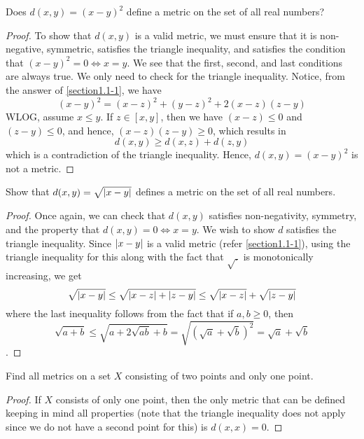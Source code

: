 \begin{question}
    Does $d(x,y) = (x-y)^2$ define a metric on the set of all real numbers?
\label{section1.1-2}
\end{question}{
\begin{proof}
    To show that $d(x,y)$ is a valid metric, we must ensure that it is non-negative, symmetric, satisfies the triangle inequality, and satisfies the condition that $(x-y)^2 = 0 \iff x = y$. We see that the first, second, and last conditions are always true. We only need to check for the triangle inequality. Notice, from the answer of \ref{section1.1-1}, we have
    \[(x-y)^2 = (x-z)^2 + (y-z)^2 + 2(x-z)(z-y)\]
    WLOG, assume $x \leq y$. If $z \in [x,y]$, then we have $(x-z) \leq 0$ and $(z-y) \leq 0$, and hence, $(x-z)(z-y) \geq 0$, which results in 
    \[d(x,y) \geq d(x,z) + d(z,y)\]
    which is a contradiction of the triangle inequality. Hence, $d(x,y) = (x-y)^2$ is not a metric.
\end{proof}

\begin{question}
    Show that $d(x,y) = \sqrt{\left\lvert x-y \right\rvert}$ defines a metric on the set of all real numbers.
\label{section1.1-3}
\end{question}
\begin{proof}
    Once again, we can check that $d(x,y)$ satisfies non-negativity, symmetry, and the property that $d(x,y) = 0 \iff x = y$. We wish to show $d$ satisfies the triangle inequality. Since $\left\lvert x-y \right\rvert$ is a valid metric (refer \ref{section1.1-1}), using the triangle inequality for this along with the fact that $\sqrt{.}$ is monotonically increasing, we get
    \[\sqrt{\left\lvert x-y \right\rvert} \leq \sqrt{\left\lvert x-z \right\rvert + \left\lvert z-y \right\rvert} \leq \sqrt{\left\lvert x-z \right\rvert} + \sqrt{\left\lvert z-y \right\rvert}\]
    where the last inequality follows from the fact that if $a , b \geq 0$, then 
    \[\sqrt{a + b} \leq \sqrt{a + 2\sqrt{ab} + b} = \sqrt{(\sqrt{a} + \sqrt{b})^2} = \sqrt{a} + \sqrt{b}\].
\end{proof}

\begin{question}
    Find all metrics on a set $X$ consisting of two points and only one point.
    \label{section1.1-4}
\end{question}
\begin{proof}
    If $X$ consists of only one point, then the only metric that can be defined keeping in mind all properties (note that the triangle inequality does not apply since we do not have a second point for this) is $d(x,x) = 0$.


\end{proof}}
